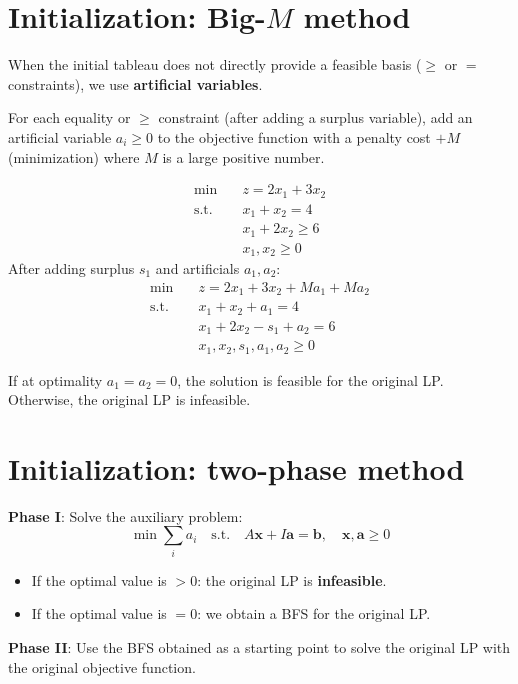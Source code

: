 \section{Initialization: Big-$M$ method}

When the initial tableau does not directly provide a feasible basis ($\ge$
or $=$ constraints), we use \textbf{artificial variables}.

\begin{definition}
For each equality or $\ge$ constraint (after adding a surplus variable), add
an artificial variable $a_i \ge 0$ to the objective function with a penalty
cost $+M$ (minimization) where $M$ is a large positive number.
\end{definition}

\begin{example}[Big-$M$]
\[
\begin{aligned}
  \min \quad & z = 2x_1 + 3x_2 \\
  \text{s.t.} \quad
    & x_1 + x_2 = 4 \\
    & x_1 + 2x_2 \ge 6 \\
    & x_1, x_2 \ge 0
\end{aligned}
\]
After adding surplus $s_1$ and artificials $a_1, a_2$:
\[
\begin{aligned}
  \min \quad & z = 2x_1 + 3x_2 + Ma_1 + Ma_2 \\
  \text{s.t.} \quad
    & x_1 + x_2 + a_1 = 4 \\
    & x_1 + 2x_2 - s_1 + a_2 = 6 \\
    & x_1, x_2, s_1, a_1, a_2 \ge 0
\end{aligned}
\]

If at optimality $a_1 = a_2 = 0$, the solution is feasible for the original
LP.  Otherwise, the original LP is infeasible.
\end{example}

\section{Initialization: two-phase method}

\begin{algorithme}[title=\textbf{Two-phase method}]
\textbf{Phase I}: Solve the auxiliary problem:
\[
  \min \sum_{i} a_i \quad \text{s.t.} \quad
  A\mathbf{x} + I\mathbf{a} = \mathbf{b}, \quad
  \mathbf{x}, \mathbf{a} \ge 0
\]
\begin{itemize}
  \item If the optimal value is $> 0$: the original LP is \textbf{infeasible}.
  \item If the optimal value is $= 0$: we obtain a BFS for the original LP.
\end{itemize}

\textbf{Phase II}: Use the BFS obtained as a starting point to solve the
original LP with the original objective function.
\end{algorithme}

